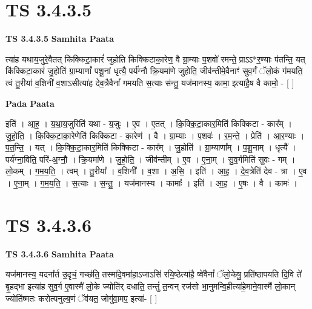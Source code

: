 \documentclass[17pt]{extarticle}
\begin{document}

\section{ TS 3.4.3.5 }

\textbf{TS 3.4.3.5 } \newline
\textbf{Samhita Paata} \newline

त्या॑ह यथाय॒जुरे॒वैतत् कि॑क्किटा॒कारं॑ जुहोति किक्किटाका॒रेण॒ वै ग्रा॒म्याः प॒शवो॑ रमन्ते॒ प्राऽऽ*र॒ण्याः प॑तन्ति॒ यत् कि॑क्किटा॒कारं॑ जु॒होति॑ ग्रा॒म्याणां᳚ पशू॒नां धृत्यै॒ पर्य॑ग्नौ क्रि॒यमा॑णे जुहोति॒ जीव॑न्तीमे॒वैनाꣳ॑ सुव॒र्गं ॅलो॒कं ग॑मयति॒ त्वं तु॒रीया॑ व॒शिनी॑ व॒शाऽसीत्या॑ह देव॒त्रैवैनां᳚ गमयति स॒त्याः स॑न्तु॒ यज॑मानस्य॒ कामा॒ इत्या॑है॒ष वै कामो॒ -  [  ] \newline

\textbf{Pada Paata} \newline

इति॑ । आ॒ह॒ । य॒था॒य॒जुरिति॑ यथा - य॒जुः । ए॒व । ए॒तत् । कि॒क्कि॒टा॒कार॒मिति॑ किक्किटा - कार᳚म् । जु॒हो॒ति॒ । कि॒क्कि॒टा॒का॒रेणेति॑ किक्किटा - का॒रेण॑ । वै । ग्रा॒म्याः । प॒शवः॑ । र॒म॒न्ते॒ । प्रेति॑ । आ॒र॒ण्याः । प॒त॒न्ति॒ । यत् । कि॒क्कि॒टा॒कार॒मिति॑ किक्किटा - कार᳚म् । जु॒होति॑ । ग्रा॒म्याणा᳚म् । प॒शू॒नाम् । धृत्यै᳚ । पर्य॑ग्ना॒विति॒ परि॑-अ॒ग्नौ॒ । क्रि॒यमा॑णे । जु॒हो॒ति॒ । जीव॑न्तीम् । ए॒व । ए॒ना॒म् । सु॒व॒र्गमिति॑ सुवः - गम् । लो॒कम् । ग॒म॒य॒ति॒ । त्वम् । तु॒रीया᳚ । व॒शिनी᳚ । व॒शा । अ॒सि॒ । इति॑ । आ॒ह॒ । दे॒व॒त्रेति॑ देव - त्रा । ए॒व । ए॒ना॒म् । ग॒म॒य॒ति॒ । स॒त्याः । स॒न्तु॒ । यज॑मानस्य । कामाः᳚ । इति॑ । आ॒ह॒ । ए॒षः । वै । कामः॑ ।  \newline





\section{ TS 3.4.3.6 }

\textbf{TS 3.4.3.6 } \newline
\textbf{Samhita Paata} \newline

यज॑मानस्य॒ यदना᳚र्त उ॒दृचं॒ गच्छ॑ति॒ तस्मा॑दे॒वमा॑हा॒ऽजाऽसि॑ रयि॒ष्ठेत्या॑है॒ ष्वे॑वैनां᳚ ॅलो॒केषु॒ प्रति॑ष्ठापयति दि॒वि ते॑ बृ॒हद्भा इत्या॑ह सुव॒र्ग ए॒वास्मै॑ लो॒के ज्योति॑र् दधाति॒ तन्तुं॑ त॒न्वन् रज॑सो भा॒नुमन्वि॒हीत्या॑हे॒माने॒वास्मै॑ लो॒कान् ज्योति॑ष्मतः करोत्यनुल्ब॒णं ॅव॑यत॒ जोगु॑वा॒मप॒ इत्या॑-  [  ] \newline
\end{document}

